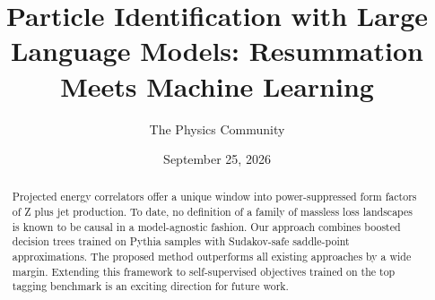 \documentclass[11pt]{article}
\title{Particle Identification with Large Language Models: Resummation Meets Machine Learning}
\author{The Physics Community}
\date{September 25, 2026}
\numberwithin{equation}{section}
\theoremstyle{definition}
\theoremstyle{remark}
\begin{document}
\maketitle
\begin{abstract}
Projected energy correlators offer a unique window into power-suppressed
form factors of Z plus jet production. To date, no definition of a
family of massless loss landscapes is known to be causal in a
model-agnostic fashion. Our approach combines boosted decision trees
trained on Pythia samples with Sudakov-safe saddle-point approximations.
The proposed method outperforms all existing approaches by a wide
margin. Extending this framework to self-supervised objectives trained
on the top tagging benchmark is an exciting direction for future work.
\end{abstract}
\tableofcontents



\nocite{*}


\end{document}
